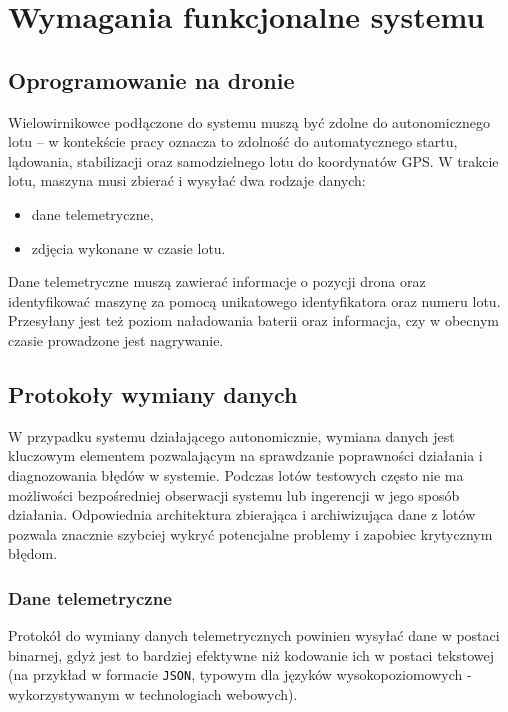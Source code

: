 \chapter{Wymagania funkcjonalne systemu} \label{chapter_functional_requirements}

\section{Oprogramowanie na dronie}

Wielowirnikowce podłączone do systemu muszą być
zdolne do autonomicznego lotu -- w kontekście pracy
oznacza to zdolność do automatycznego startu,
lądowania, stabilizacji oraz samodzielnego
lotu do koordynatów GPS. W trakcie lotu, maszyna musi
zbierać i wysyłać dwa rodzaje danych:
\begin{itemize}
    \item dane telemetryczne,
    \item zdjęcia wykonane w czasie lotu.
\end{itemize}

Dane telemetryczne muszą zawierać informacje o pozycji
drona oraz identyfikować maszynę za pomocą unikatowego
identyfikatora oraz numeru lotu. Przesyłany jest też
poziom naładowania baterii oraz informacja, czy w obecnym
czasie prowadzone jest nagrywanie.

\section{Protokoły wymiany danych}

W przypadku systemu działającego autonomicznie, wymiana danych jest kluczowym
elementem pozwalającym na sprawdzanie poprawności działania
i diagnozowania błędów w systemie. Podczas lotów testowych
często nie ma możliwości bezpośredniej obserwacji systemu
lub ingerencji w jego sposób działania. Odpowiednia architektura
zbierająca i archiwizująca dane z lotów pozwala znacznie szybciej 
wykryć potencjalne problemy i zapobiec krytycznym błędom. 

\subsection{Dane telemetryczne}
Protokół do wymiany danych telemetrycznych powinien
wysyłać dane w postaci binarnej, gdyż jest to bardziej
efektywne niż kodowanie ich w postaci tekstowej (na
przykład w formacie \texttt{JSON}, typowym dla języków
wysokopoziomowych - wykorzystywanym w technologiach webowych).

